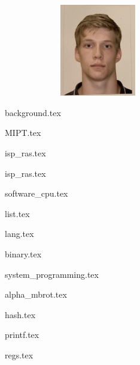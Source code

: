 \documentclass[11pt]{article}
\begin{document}
\begin{figure}[t]
    \noindent 
    \begin{figure}
        \begin{flushright}
            \includegraphics[width=4cm,height=4cm,keepaspectratio]{components/for_CV.jpg}
        \end{flushright}
    \end{figure}
\end{figure}

\noindent

{background.tex}


{MIPT.tex}


{isp_ras.tex}


{isp_ras.tex}


{software_cpu.tex}

{list.tex}

{lang.tex}

{binary.tex}

{system_programming.tex}


{alpha_mbrot.tex}

{hash.tex}


{printf.tex}

{regs.tex}
\end{document}
